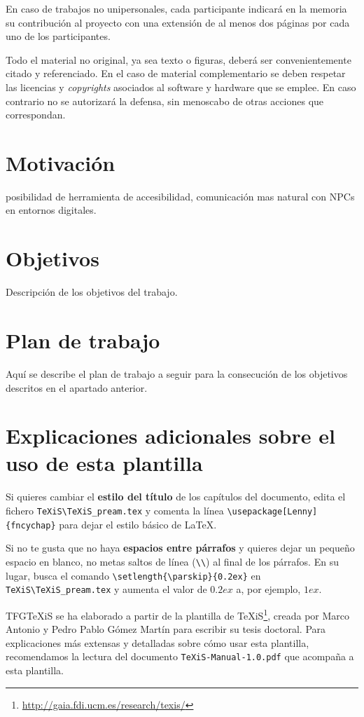 En caso de trabajos no unipersonales, cada participante indicará en la memoria su contribución al proyecto con una extensión de al menos dos páginas por cada uno de los participantes.

Todo el material no original, ya sea texto o figuras, deberá ser convenientemente citado y referenciado. En el caso de material complementario se deben respetar las licencias y \emph{copyrights} asociados al software y hardware que se emplee. En caso contrario no se autorizará la defensa, sin menoscabo de otras acciones que correspondan.


\section{Motivación}
posibilidad de herramienta de accesibilidad, comunicación mas natural con NPCs en entornos digitales.


\section{Objetivos}
Descripción de los objetivos del trabajo.


\section{Plan de trabajo}
Aquí se describe el plan de trabajo a seguir para la consecución de los objetivos descritos en el apartado anterior.



\section{Explicaciones adicionales sobre el uso de esta plantilla}
Si quieres cambiar el \textbf{estilo del título} de los capítulos del documento, edita el fichero \verb|TeXiS\TeXiS_pream.tex| y comenta la línea \verb|\usepackage[Lenny]{fncychap}| para dejar el estilo básico de \LaTeX.

Si no te gusta que no haya \textbf{espacios entre párrafos} y quieres dejar un pequeño espacio en blanco, no metas saltos de línea (\verb|\\|) al final de los párrafos. En su lugar, busca el comando  \verb|\setlength{\parskip}{0.2ex}| en \verb|TeXiS\TeXiS_pream.tex| y aumenta el valor de $0.2ex$ a, por ejemplo, $1ex$.

TFGTeXiS se ha elaborado a partir de la plantilla de TeXiS\footnote{\url{http://gaia.fdi.ucm.es/research/texis/}}, creada por Marco Antonio y Pedro Pablo Gómez Martín para escribir su tesis doctoral. Para explicaciones más extensas y detalladas sobre cómo usar esta plantilla, recomendamos la lectura del documento \texttt{TeXiS-Manual-1.0.pdf} que acompaña a esta plantilla.

